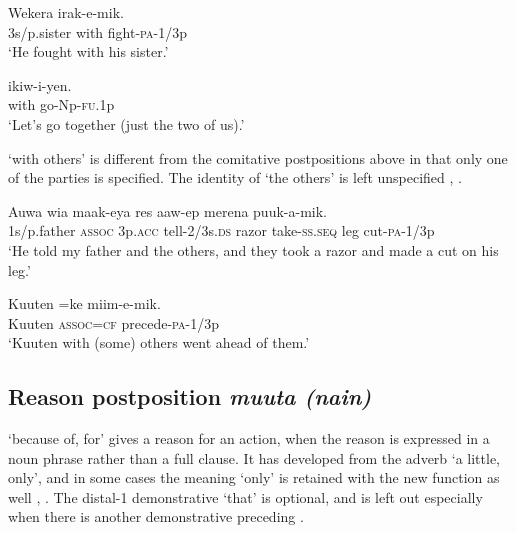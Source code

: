 \ea%
\label{ex:3:x752}
\gll Wekera  irak-e-mik. \\
3s/p.sister with fight-\textsc{pa}-1/3p\\
\glt`He fought with his sister.'
\z

\ea%
\label{ex:3:x753}
\gll {} ikiw-i-yen. \\
with go-Np-\textsc{fu}.1p\\
\glt`Let's go together (just the two of us).'
\z

  `with others' is different from the comitative postpositions above in that only one of the parties is specified. The identity of `the others' is left unspecified , .

\ea%
\label{ex:3:x826}
\gll Auwa  wia maak-eya res aaw-ep merena puuk-a-mik.\\
1s/p.father \textsc{assoc} 3p.\textsc{acc} tell-2/3s.\textsc{ds} razor take-\textsc{ss}.\textsc{seq} leg cut-\textsc{pa}-1/3p\\
\glt`He told my father and the others, and they took a razor and made a cut on his leg.'
\z

\ea%
\label{ex:3:x827}
\gll Kuuten =ke miim-e-mik. \\
Kuuten \textsc{assoc}=\textsc{cf} precede-\textsc{pa}-1/3p\\
\glt`Kuuten with (some) others went ahead of them.'
\z

\subsection{Reason postposition \textit{muuta (nain)}}
{}
 `because of, for' gives a reason for an action, when the reason is expressed in a noun phrase rather than a full clause. It has developed from the adverb  `a little, only', and in some cases the meaning `only' is retained with the new function as well , . The distal-1 demonstrative  `that' is optional, and is left out especially when there is another demonstrative  preceding  .

